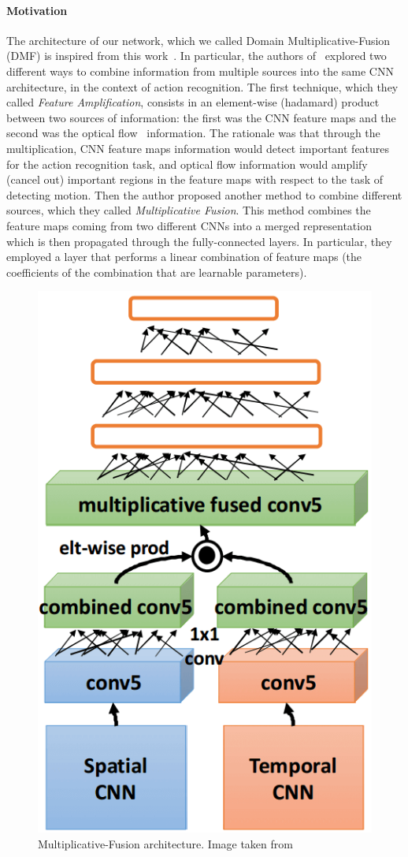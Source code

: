 \documentclass[../main.tex]{subfiles}
\begin{document}
    \paragraph{Motivation}
    The architecture of our network, which we called Domain Multiplicative-Fusion (DMF) is inspired from this work~\cite{multfusion}.
    In particular, the authors of~\cite{multfusion} explored two different ways to combine information from multiple sources into the same
    CNN architecture, in the context of action recognition. The first technique, which they called \textit{Feature Amplification},
    consists in an element-wise (hadamard) product between two sources of information: the first was the CNN feature maps and the second
    was the optical flow~\cite{opticalflow} information. The rationale was that through the multiplication, CNN feature maps information
    would detect important features for the action recognition task, and optical flow information would amplify (cancel out) important regions
    in the feature maps with respect to the task of detecting motion.
    Then the author proposed another method to combine different sources, which they called \textit{Multiplicative Fusion}. This method combines
    the feature maps coming from two different CNNs into a merged representation which is then propagated through the fully-connected layers.
    In particular, they employed a layer that performs a linear combination of feature maps (the coefficients of the combination that are learnable
    parameters).

    \begin{figure}[h!]
        \centering{}
        \includegraphics[width=.5\linewidth]{./img/multfusion.png}
        \caption{Multiplicative-Fusion architecture. Image taken from~\cite{multfusion}}\label{fig:multfusion}
    \end{figure}
\end{document}
